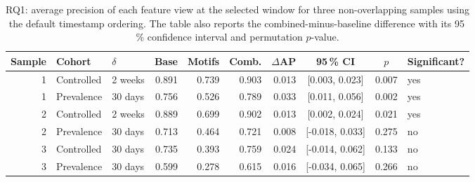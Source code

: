 \begin{table}[ht]
\centering
\caption{RQ1: average precision of each feature view at the selected window for three non-overlapping samples using the default timestamp ordering. The table also reports the combined-minus-baseline difference with its 95\,\% confidence interval and permutation $p$-value.}
\label{tab:res_rq1}
\footnotesize
\setlength{\tabcolsep}{4pt}
\begin{tabular}{@{}r l l r r r r c c l@{}}
\toprule
\textbf{Sample} & \textbf{Cohort} & \textbf{$\delta$} & \textbf{Base} & \textbf{Motifs} & \textbf{Comb.} & \textbf{$\Delta$AP} & \textbf{95\,\% CI} & \textbf{$p$} & \textbf{Significant?} \\
\midrule
1 & Controlled & 2 weeks & 0.891 & 0.739 & 0.903 & 0.013 & [0.003, 0.023] & 0.007 & yes \\
1 & Prevalence & 30 days & 0.756 & 0.526 & 0.789 & 0.033 & [0.011, 0.056] & 0.002 & yes \\
2 & Controlled & 2 weeks & 0.889 & 0.699 & 0.902 & 0.013 & [0.002, 0.024] & 0.021 & yes \\
2 & Prevalence & 30 days & 0.713 & 0.464 & 0.721 & 0.008 & [-0.018, 0.033] & 0.275 & no \\
3 & Controlled & 30 days & 0.735 & 0.393 & 0.759 & 0.024 & [-0.014, 0.062] & 0.133 & no \\
3 & Prevalence & 30 days & 0.599 & 0.278 & 0.615 & 0.016 & [-0.034, 0.065] & 0.266 & no \\
\bottomrule
\end{tabular}
\end{table}
